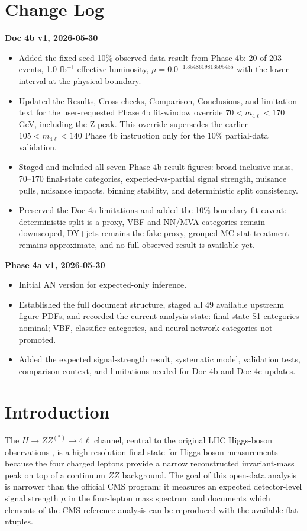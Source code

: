 \documentclass[11pt]{article}
\begin{document}
\section*{Change Log}
\textbf{Doc 4b v1, 2026-05-30}
\begin{itemize}[leftmargin=*]
\item Added the fixed-seed 10\% observed-data result from Phase 4b: 20 of 203 events, 1.0 fb$^{-1}$ effective luminosity, $\mu=0.0^{+1.3548619813595435}$ with the lower interval at the physical boundary.
\item Updated the Results, Cross-checks, Comparison, Conclusions, and limitation text for the user-requested Phase 4b fit-window override $70 < m_{4\ell} < 170$ GeV, including the Z peak. This override supersedes the earlier $105 < m_{4\ell} < 140$ Phase 4b instruction only for the 10\% partial-data validation.
\item Staged and included all seven Phase 4b result figures: broad inclusive mass, 70--170 final-state categories, expected-vs-partial signal strength, nuisance pulls, nuisance impacts, binning stability, and deterministic split consistency.
\item Preserved the Doc 4a limitations and added the 10\% boundary-fit caveat: deterministic split is a proxy, VBF and NN/MVA categories remain downscoped, DY+jets remains the fake proxy, grouped MC-stat treatment remains approximate, and no full observed result is available yet.
\end{itemize}
\textbf{Phase 4a v1, 2026-05-30}
\begin{itemize}[leftmargin=*]
\item Initial AN version for expected-only inference.
\item Established the full document structure, staged all 49 available upstream figure PDFs, and recorded the current analysis state: final-state S1 categories nominal; VBF, classifier categories, and neural-network categories not promoted.
\item Added the expected signal-strength result, systematic model, validation tests, comparison context, and limitations needed for Doc 4b and Doc 4c updates.
\end{itemize}
\clearpage
\section{Introduction}
The $H\to ZZ^{(*)}\to4\ell$ channel, central to the original LHC Higgs-boson observations \cite{CMSDiscovery2012,ATLASDiscovery2012}, is a high-resolution final state for Higgs-boson measurements because the four charged leptons provide a narrow reconstructed invariant-mass peak on top of a continuum $ZZ$ background. The goal of this open-data analysis is narrower than the official CMS program: it measures an expected detector-level signal strength $\mu$ in the four-lepton mass spectrum and documents which elements of the CMS reference analysis can be reproduced with the available flat ntuples.
\end{document}
